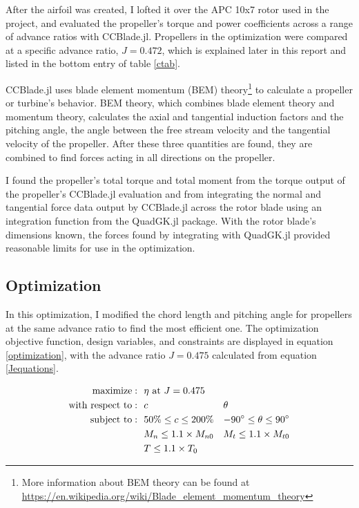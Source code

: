 \documentclass[journal ]{new-aiaa}
\newcounter{ctab}
\begin{document}
After the airfoil was created, I lofted it over the APC 10x7 rotor used in the project, and evaluated the propeller's torque and power coefficients across a range of advance ratios with CCBlade.jl. Propellers in the optimization were compared at a specific advance ratio, $J=0.472$, which is explained later in this report and listed in the bottom entry of table \eqref{ctab}. 

CCBlade.jl uses blade element momentum (BEM) theory\footnote{More information about BEM theory can be found at \url{https://en.wikipedia.org/wiki/Blade_element_momentum_theory}} to calculate a propeller or turbine's behavior. BEM theory, which combines blade element theory and momentum theory, calculates the axial and tangential induction factors and the pitching angle, the angle between the free stream velocity and the tangential velocity of the propeller. After these three quantities are found, they are combined to find forces acting in all directions on the propeller\cite{CCBlade}. 

I found the propeller's total torque and total moment from the torque output of the propeller's CCBlade.jl evaluation and from integrating the normal and tangential force data output by CCBlade.jl across the rotor blade using an integration function from the QuadGK.jl package. With the rotor blade's dimensions known, the forces found by integrating with QuadGK.jl provided reasonable limits for use in the optimization.

\subsection{Optimization}

In this optimization, I modified the chord length and pitching angle for propellers at the same advance ratio to find the most efficient one. The optimization objective function, design variables, and constraints are displayed in equation \eqref{optimization}, with the advance ratio $J=0.475$ calculated from equation \eqref{Jequations}. 

\begin{equation}
	\begin{aligned}
		\mathrm{maximize:}& ~~ \eta ~ \text{at} ~ J = 0.475 \\
		\mathrm{with~respect~to:}& ~~ c & \multicolumn{1}{l}{$\theta$} \\
		\mathrm{subject~to:}& ~~ 50\% \leq c \leq 200\% & -90^{\circ} \leq \theta \leq 90^{\circ} \\
		& ~~ M_{n} \leq 1.1 \times M_{n0} & M_{t} \leq 1.1 \times M_{t0} \\
		& ~~ T \leq 1.1 \times T_{0} \\
	\end{aligned}
	\label{optimization}
\end{equation}
\end{document}
